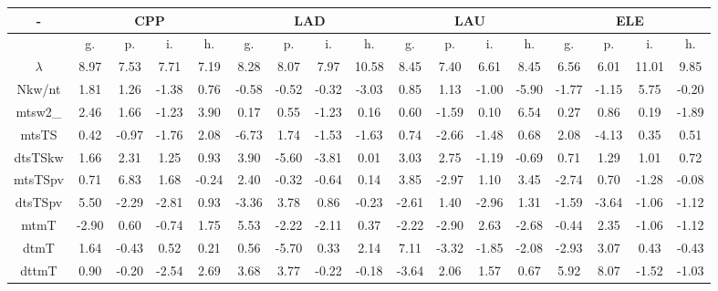 \documentclass[%
 aip,
 jmp,%
 amsmath,amssymb,
 reprint,%
 floatfix,
]{revtex4-1}
\begin{document}
\begin{table}
\begin{tabular}{|c|| c|c|c|c|| c|c|c|c|| c|c|c|c|| c|c|c|c|}\hline
  \centering
    \scriptsize
\setlength{\tabcolsep}{.26667em}
-\-  & \multicolumn{4}{c|}{CPP} & \multicolumn{4}{c|}{LAD} & \multicolumn{4}{c|}{LAU} & \multicolumn{4}{c|}{ELE} \\ \hline\hline
 & g. & p. & i. & h. &     g. & p. & i. & h. &    g. & p. & i. & h. &    g. & p. & i. & h. \\\hline
$\lambda$ & 8.97 & 7.53 & 7.71 & 7.19 & 8.28 & 8.07 & 7.97 & 10.58 & 8.45 & 7.40 & 6.61 & 8.45 & 6.56 & 6.01 & 11.01 & 9.85 \\\hline
Nkw/nt & 1.81 & 1.26 & -1.38 & 0.76 & -0.58 & -0.52 & -0.32 & -3.03 & 0.85 & 1.13 & -1.00 & -5.90 & -1.77 & -1.15 & 5.75 & -0.20 \\\hline
mtsw2\_ & 2.46 & 1.66 & -1.23 & 3.90 & 0.17 & 0.55 & -1.23 & 0.16 & 0.60 & -1.59 & 0.10 & 6.54 & 0.27 & 0.86 & 0.19 & -1.89 \\\hline
mtsTS & 0.42 & -0.97 & -1.76 & 2.08 & -6.73 & 1.74 & -1.53 & -1.63 & 0.74 & -2.66 & -1.48 & 0.68 & 2.08 & -4.13 & 0.35 & 0.51 \\\hline
dtsTSkw & 1.66 & 2.31 & 1.25 & 0.93 & 3.90 & -5.60 & -3.81 & 0.01 & 3.03 & 2.75 & -1.19 & -0.69 & 0.71 & 1.29 & 1.01 & 0.72 \\\hline
mtsTSpv & 0.71 & 6.83 & 1.68 & -0.24 & 2.40 & -0.32 & -0.64 & 0.14 & 3.85 & -2.97 & 1.10 & 3.45 & -2.74 & 0.70 & -1.28 & -0.08 \\\hline
dtsTSpv & 5.50 & -2.29 & -2.81 & 0.93 & -3.36 & 3.78 & 0.86 & -0.23 & -2.61 & 1.40 & -2.96 & 1.31 & -1.59 & -3.64 & -1.06 & -1.12 \\\hline
mtmT & -2.90 & 0.60 & -0.74 & 1.75 & 5.53 & -2.22 & -2.11 & 0.37 & -2.22 & -2.90 & 2.63 & -2.68 & -0.44 & 2.35 & -1.06 & -1.12 \\\hline
dtmT & 1.64 & -0.43 & 0.52 & 0.21 & 0.56 & -5.70 & 0.33 & 2.14 & 7.11 & -3.32 & -1.85 & -2.08 & -2.93 & 3.07 & 0.43 & -0.43 \\\hline
dttmT & 0.90 & -0.20 & -2.54 & 2.69 & 3.68 & 3.77 & -0.22 & -0.18 & -3.64 & 2.06 & 1.57 & 0.67 & 5.92 & 8.07 & -1.52 & -1.03 \\\hline

\end{tabular}
\end{table}
\end{document}
